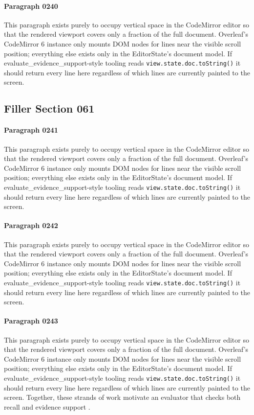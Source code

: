 \documentclass{article}
\begin{document}
\paragraph{Paragraph 0240}
This paragraph exists purely to occupy vertical space in the CodeMirror editor so that the rendered viewport covers only a fraction of the full document. Overleaf's CodeMirror 6 instance only mounts DOM nodes for lines near the visible scroll position; everything else exists only in the EditorState's document model. If evaluate\_evidence\_support-style tooling reads \texttt{view.state.doc.toString()} it should return every line here regardless of which lines are currently painted to the screen.

\subsection{Filler Section 061}
\paragraph{Paragraph 0241}
This paragraph exists purely to occupy vertical space in the CodeMirror editor so that the rendered viewport covers only a fraction of the full document. Overleaf's CodeMirror 6 instance only mounts DOM nodes for lines near the visible scroll position; everything else exists only in the EditorState's document model. If evaluate\_evidence\_support-style tooling reads \texttt{view.state.doc.toString()} it should return every line here regardless of which lines are currently painted to the screen.

\paragraph{Paragraph 0242}
This paragraph exists purely to occupy vertical space in the CodeMirror editor so that the rendered viewport covers only a fraction of the full document. Overleaf's CodeMirror 6 instance only mounts DOM nodes for lines near the visible scroll position; everything else exists only in the EditorState's document model. If evaluate\_evidence\_support-style tooling reads \texttt{view.state.doc.toString()} it should return every line here regardless of which lines are currently painted to the screen.

\paragraph{Paragraph 0243}
This paragraph exists purely to occupy vertical space in the CodeMirror editor so that the rendered viewport covers only a fraction of the full document. Overleaf's CodeMirror 6 instance only mounts DOM nodes for lines near the visible scroll position; everything else exists only in the EditorState's document model. If evaluate\_evidence\_support-style tooling reads \texttt{view.state.doc.toString()} it should return every line here regardless of which lines are currently painted to the screen. Together, these strands of work motivate an evaluator that checks both recall and evidence support \citep{yamamoto2020evidence,chen2019graphattn}.
\end{document}
